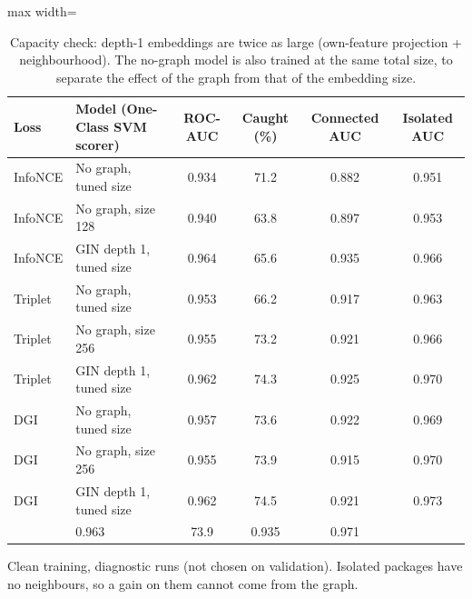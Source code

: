 \begin{table}[htbp]
\centering
\small
\caption{Capacity check: depth-1 embeddings are twice as large (own-feature projection + neighbourhood). The no-graph model is also trained at the same total size, to separate the effect of the graph from that of the embedding size.}
\label{tab:capacity}
\begin{adjustbox}{max width=\linewidth}
\begin{tabular}{llcccc}
\toprule
Loss & Model (One-Class SVM scorer) & ROC-AUC & Caught (\%) & Connected AUC & Isolated AUC \\
\midrule
InfoNCE & No graph, tuned size & 0.934 & 71.2 & 0.882 & 0.951 \\
InfoNCE & No graph, size 128 & 0.940 & 63.8 & 0.897 & 0.953 \\
InfoNCE & GIN depth 1, tuned size & 0.964 & 65.6 & 0.935 & 0.966 \\
\addlinespace
Triplet & No graph, tuned size & 0.953 & 66.2 & 0.917 & 0.963 \\
Triplet & No graph, size 256 & 0.955 & 73.2 & 0.921 & 0.966 \\
Triplet & GIN depth 1, tuned size & 0.962 & 74.3 & 0.925 & 0.970 \\
\addlinespace
DGI & No graph, tuned size & 0.957 & 73.6 & 0.922 & 0.969 \\
DGI & No graph, size 256 & 0.955 & 73.9 & 0.915 & 0.970 \\
DGI & GIN depth 1, tuned size & 0.962 & 74.5 & 0.921 & 0.973 \\
\addlinespace
\multicolumn{2}{l}{Raw One-Class SVM} & 0.963 & 73.9 & 0.935 & 0.971 \\
\bottomrule
\end{tabular}
\end{adjustbox}
\par\smallskip
\parbox{0.95\linewidth}{\footnotesize Clean training, diagnostic runs (not chosen on validation). Isolated packages have no neighbours, so a gain on them cannot come from the graph.}
\end{table}
